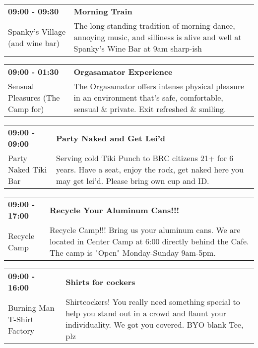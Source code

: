 \begin{tabular}{ p{1in} p{2.2in} }
    \textbf{09:00 - 09:30} & \textbf{Morning Train} \\
    Spanky's Village (and wine bar) \newline  & The long-standing tradition of morning dance, annoying music, and silliness is alive and well at Spanky's Wine Bar at 9am sharp-ish \\
    \hline 
\end{tabular}
    
\begin{tabular}{ p{1in} p{2.2in} }
    \textbf{09:00 - 01:30} & \textbf{Orgasamator Experience} \\
    Sensual Pleasures (The Camp for) \newline  & The Orgasamator offers intense physical pleasure in an environment that's safe, comfortable, sensual \& private.  Exit refreshed \& smiling. \\
    \hline 
\end{tabular}
    
\begin{tabular}{ p{1in} p{2.2in} }
    \textbf{09:00 - 09:00} & \textbf{Party Naked and Get Lei'd} \\
    Party Naked Tiki Bar \newline  & Serving cold Tiki Punch to BRC citizens 21+ for 6 years. Have a seat, enjoy the rock, get naked here you may get lei'd. Please bring own cup and ID. \\
    \hline 
\end{tabular}
    
\begin{tabular}{ p{1in} p{2.2in} }
    \textbf{09:00 - 17:00} & \textbf{Recycle Your Aluminum Cans!!!} \\
    Recycle Camp \newline  & Recycle Camp!!! Bring us your aluminum cans. We are located in Center Camp at 6:00 directly behind the Cafe. The camp is "Open" Monday-Sunday 9am-5pm. \\
    \hline 
\end{tabular}
    
\begin{tabular}{ p{1in} p{2.2in} }
    \textbf{09:00 - 16:00} & \textbf{Shirts for cockers} \\
    Burning Man T-Shirt Factory \newline  & Shirtcockers! You really need something special to help you stand out in a crowd and flaunt your individuality. We got you covered. BYO blank Tee, plz \\
    \hline 
\end{tabular}
    
